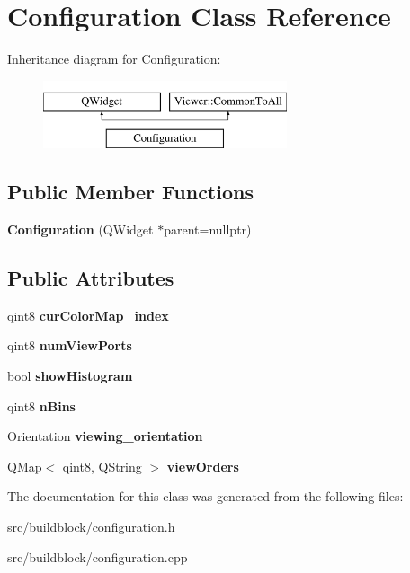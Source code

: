 \hypertarget{classConfiguration}{}\section{Configuration Class Reference}
\label{classConfiguration}
Inheritance diagram for Configuration\+:\begin{figure}[H]
\begin{center}
\leavevmode
\includegraphics[height=2.000000cm]{classConfiguration}
\end{center}
\end{figure}
\subsection*{Public Member Functions}
\begin{DoxyCompactItemize}
\item 
\mbox{\label{classConfiguration_a2e4474e9c5370084c1b24037b90b9557}} 
{\bfseries Configuration} (Q\+Widget $\ast$parent=nullptr)
\end{DoxyCompactItemize}
\subsection*{Public Attributes}
\begin{DoxyCompactItemize}
\item 
\mbox{\label{classConfiguration_a6194decfd2dc5dbce1a8da67044c356a}} 
qint8 {\bfseries cur\+Color\+Map\+\_\+index}
\item 
\mbox{\label{classConfiguration_a28457f61f901ab5dabd7d47328ba4a34}} 
qint8 {\bfseries num\+View\+Ports}
\item 
\mbox{\label{classConfiguration_ac4fd650a5af1e2342e17d0c7ba3b25bf}} 
bool {\bfseries show\+Histogram}
\item 
\mbox{\label{classConfiguration_a4b9b95973c7ad8d078fded238961c82e}} 
qint8 {\bfseries n\+Bins}
\item 
\mbox{\label{classConfiguration_a4a6f45e6f4c5f545bfbb3b084cc7e42b}} 
Orientation {\bfseries viewing\+\_\+orientation}
\item 
\mbox{\label{classViewer_1_1CommonToAll_a6d05cfc549856952676aedd015e3b57b}} 
Q\+Map$<$ qint8, Q\+String $>$ {\bfseries view\+Orders}
\end{DoxyCompactItemize}


The documentation for this class was generated from the following files\+:\begin{DoxyCompactItemize}
\item 
src/buildblock/configuration.\+h\item 
src/buildblock/configuration.\+cpp\end{DoxyCompactItemize}
